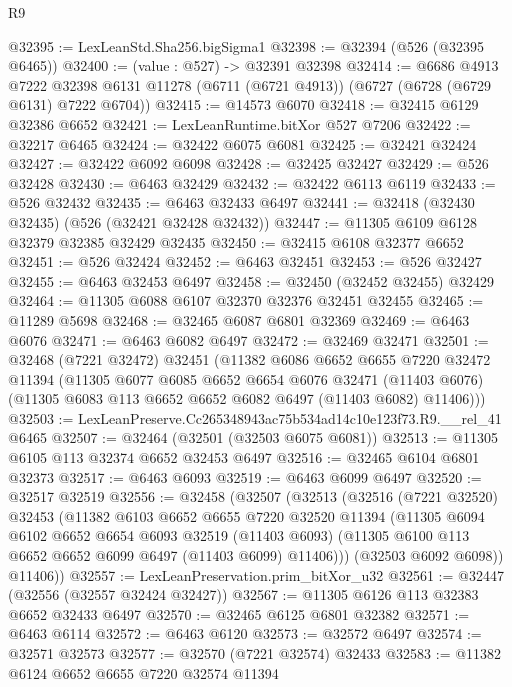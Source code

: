 \begin{lexlean}{R9}
\begin{coremodule}
@32395 := LexLeanStd.Sha256.bigSigma1
@32398 := @32394 (@526 (@32395 @6465))
@32400 := (value : @527) -> @32391 @32398
@32414 := @6686
    @4913
    @7222
    @32398
    @6131
    @11278
    (@6711 (@6721 @4913))
    (@6727 (@6728 (@6729 @6131) @7222 @6704))
@32415 := @14573 @6070
@32418 := @32415 @6129 @32386 @6652
@32421 := LexLeanRuntime.bitXor @527 @7206
@32422 := @32217 @6465
@32424 := @32422 @6075 @6081
@32425 := @32421 @32424
@32427 := @32422 @6092 @6098
@32428 := @32425 @32427
@32429 := @526 @32428
@32430 := @6463 @32429
@32432 := @32422 @6113 @6119
@32433 := @526 @32432
@32435 := @6463 @32433 @6497
@32441 := @32418 (@32430 @32435) (@526 (@32421 @32428 @32432))
@32447 := @11305 @6109 @6128 @32379 @32385 @32429 @32435
@32450 := @32415 @6108 @32377 @6652
@32451 := @526 @32424
@32452 := @6463 @32451
@32453 := @526 @32427
@32455 := @6463 @32453 @6497
@32458 := @32450 (@32452 @32455) @32429
@32464 := @11305 @6088 @6107 @32370 @32376 @32451 @32455
@32465 := @11289 @5698
@32468 := @32465 @6087 @6801 @32369
@32469 := @6463 @6076
@32471 := @6463 @6082 @6497
@32472 := @32469 @32471
@32501 := @32468
    (@7221 @32472)
    @32451
    (@11382
      @6086
      @6652
      @6655
      @7220
      @32472
      @11394
      (@11305
        @6077
        @6085
        @6652
        @6654
        @6076
        @32471
        (@11403 @6076)
        (@11305 @6083 @113 @6652 @6652 @6082 @6497 (@11403 @6082) @11406)))
@32503 := LexLeanPreserve.Cc265348943ac75b534ad14c10e123f73.R9.__rel_41 @6465
@32507 := @32464 (@32501 (@32503 @6075 @6081))
@32513 := @11305 @6105 @113 @32374 @6652 @32453 @6497
@32516 := @32465 @6104 @6801 @32373
@32517 := @6463 @6093
@32519 := @6463 @6099 @6497
@32520 := @32517 @32519
@32556 := @32458
    (@32507
      (@32513
        (@32516
          (@7221 @32520)
          @32453
          (@11382
            @6103
            @6652
            @6655
            @7220
            @32520
            @11394
            (@11305
              @6094
              @6102
              @6652
              @6654
              @6093
              @32519
              (@11403 @6093)
              (@11305 @6100 @113 @6652 @6652 @6099 @6497 (@11403 @6099) @11406)))
          (@32503 @6092 @6098))
        @11406))
@32557 := LexLeanPreservation.prim_bitXor_u32
@32561 := @32447 (@32556 (@32557 @32424 @32427))
@32567 := @11305 @6126 @113 @32383 @6652 @32433 @6497
@32570 := @32465 @6125 @6801 @32382
@32571 := @6463 @6114
@32572 := @6463 @6120
@32573 := @32572 @6497
@32574 := @32571 @32573
@32577 := @32570 (@7221 @32574) @32433
@32583 := @11382 @6124 @6652 @6655 @7220 @32574 @11394

\end{coremodule}
\end{lexlean}
